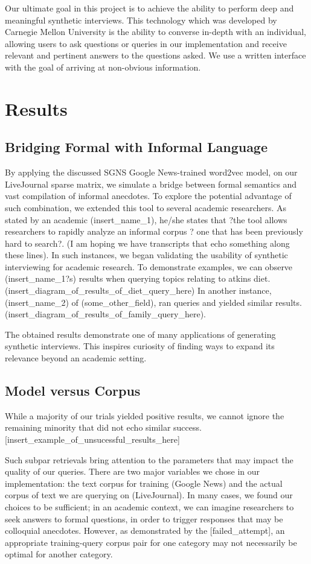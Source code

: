 \documentclass{sigchi}
\begin{document}
Our ultimate goal in this project is to achieve the ability to perform deep and meaningful synthetic interviews. This technology which was developed by Carnegie Mellon University is the ability to converse in-depth with an individual, allowing users to ask questions or queries in our implementation and receive relevant and pertinent answers to the questions asked. We use a written interface with the goal of arriving at non-obvious information. 

\section{Results}

\subsection{Bridging Formal with Informal Language}
By applying the discussed SGNS Google News-trained word2vec model, on our LiveJournal sparse matrix, we simulate a bridge between formal semantics and vast compilation of informal anecdotes. To explore the potential advantage of such combination, we extended this tool to several academic researchers. As stated by an academic (insert\_name\_1), he/she states that ?the tool allows researchers to rapidly analyze an informal corpus ? one that has been previously hard to search?. (I am hoping we have transcripts that echo something along these lines). In such instances, we began validating the usability of synthetic interviewing for academic research. To demonstrate examples, we can observe (insert\_name\_1?s) 
results when querying topics relating to atkins diet.  (insert\_diagram\_of\_results\_of\_diet\_query\_here) In another instance, (insert\_name\_2) of (some\_other\_field), ran queries and yielded similar results. (insert\_diagram\_of\_results\_of\_family\_query\_here). 

The obtained results demonstrate one of many applications of generating synthetic interviews. This inspires curiosity of finding ways to expand its relevance beyond an academic setting. 

\subsection{Model versus Corpus}
While a majority of our trials yielded positive results, we cannot ignore the remaining minority that did not echo similar success. [insert\_example\_of\_unsucessful\_results\_here]

Such subpar retrievals bring attention to the parameters that may impact the quality of our queries. There are two major variables we chose in our implementation: the text corpus for training (Google News) and the actual corpus of text we are querying on (LiveJournal). In many cases, we found our choices to be sufficient; in an academic context, we can imagine researchers to seek answers to formal questions, in order to trigger responses that may be colloquial anecdotes. However, as demonstrated by the [failed\_attempt], an appropriate training-query corpus pair for one category may not necessarily be optimal for another category.
\end{document}
